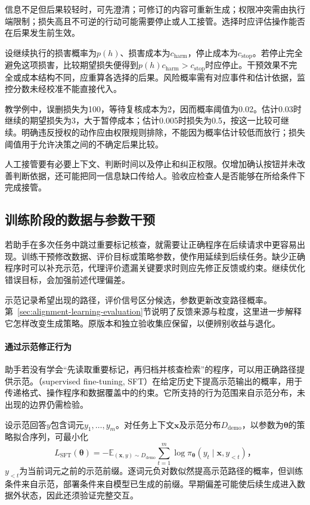 信息不足但后果较轻时，可先澄清；可修订的内容可重新生成；权限冲突需由执行端限制；损失高且不可逆的行动可能需要停止或人工接管。选择时应评估操作能否在后果发生前生效。

设继续执行的损害概率为$p(h)$、损害成本为$c_{\mathrm{harm}}$，停止成本为$c_{\mathrm{stop}}$。若停止完全避免这项损害，比较期望损失便得到$p(h)c_{\mathrm{harm}}>c_{\mathrm{stop}}$时应停止。干预效果不完全或成本结构不同，应重算各选择的后果。风险概率需有对应事件和估计依据，监控分数未经校准不能直接代入。

教学例中，误删损失为100，等待复核成本为2，因而概率阈值为0.02。估计0.03时继续的期望损失为3，大于暂停成本；估计0.005时损失为0.5，按这一比较可继续。明确违反授权的动作应由权限规则排除，不能因为概率估计较低而放行；损失阈值用于允许决策之间的不确定后果比较。

人工接管要有必要上下文、判断时间以及停止和纠正权限。仅增加确认按钮并未改善判断依据，还可能把同一信息缺口传给人。验收应检查人是否能够在所给条件下完成接管。

\subsection{训练阶段的数据与参数干预}
\label{sec:alignment-learning}
\label{sec:alignment-learning-demonstration}
\label{sec:alignment-learning-policy}

若助手在多次任务中跳过重要标记核查，就需要让正确程序在后续请求中更容易出现。训练干预修改数据、评价目标或策略参数，使作用延续到后续任务。缺少正确程序时可以补充示范，代理评价遗漏关键要求时则应先修正反馈或约束。继续优化错误目标，会加强前述代理偏差。

示范记录希望出现的路径，评价信号区分候选，参数更新改变路径概率。第~\ref{sec:alignment-learning-evaluation}节说明了反馈来源与粒度，这里进一步解释它怎样改变生成策略。原版本和独立验收集应保留，以便辨别收益与退化。

\paragraph{通过示范修正行为}

助手若没有学会“先读取重要标记，再归档并核查检索”的程序，可以用正确路径提供示范。（supervised fine-tuning, SFT）在给定历史下提高示范输出的概率，用于传递格式、操作程序和数据覆盖中的约束。它所支持的行为范围来自示范分布，未出现的边界仍需检验。

设示范回答$y$包含词元$y_1,\ldots,y_m$。对任务上下文$\bm{x}$及示范分布$D_{\mathrm{demo}}$，以参数为$\bm\theta$的策略拟合序列，可最小化
\begin{equation}
 L_{\mathrm{SFT}}(\bm{\theta})
 =-\mathbb E_{(\bm{x},y)\sim D_{\mathrm{demo}}}
   \sum_{t=1}^{m}\log\pi_{\bm{\theta}}
          (y_t\mid\bm{x},y_{<t})\text{，}
 \label{eq:alignment-sft}
\end{equation}
$y_{<t}$为当前词元之前的示范前缀。逐词元负对数似然提高示范路径的概率，但训练条件来自示范，部署条件来自模型已生成的前缀。早期偏差可能使后续生成进入数据外状态，因此还须验证完整交互。

